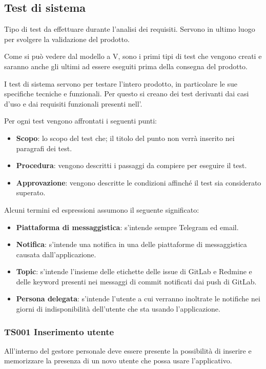 \subsection{Test di sistema}
Tipo di test da effettuare durante l'analisi dei requisiti. Servono in ultimo luogo per svolgere la validazione del prodotto.

Come si può vedere dal modello a V, sono i primi tipi di test che vengono creati e saranno anche gli ultimi ad essere eseguiti prima della consegna del prodotto.

I test di sistema servono per testare l'intero prodotto, in particolare le sue specifiche tecniche e funzionali. Per questo si creano dei test derivanti dai casi d'uso e dai requisiti funzionali presenti nell'\AdRd.

Per ogni test vengono affrontati i seguenti punti:

\begin{itemize}
	\item \textbf{Scopo}: lo scopo del test che; il titolo del punto non verrà inserito nei paragrafi dei test.
	\item \textbf{Procedura}: vengono descritti i passaggi da compiere per eseguire il test.
	\item \textbf{Approvazione}: vengono descritte le condizioni affinché il test sia considerato superato.
\end{itemize}

Alcuni termini ed espressioni assumono il seguente significato:

\begin{itemize}
	\item \textbf{Piattaforma di messaggistica}: s'intende sempre Telegram ed email.
	\item \textbf{Notifica}: s'intende una notifica in una delle piattaforme di messaggistica causata dall'applicazione.
	\item \textbf{Topic}: s'intende l'insieme delle etichette delle issue di GitLab e Redmine e delle keyword presenti nei messaggi di commit notificati dai push di GitLab.
	\item \textbf{Persona delegata}: s'intende l'utente a cui verranno inoltrate le notifiche nei giorni di indisponibilità dell'utente che sta usando l'applicazione. 
\end{itemize}

	\subsubsection{TS001 Inserimento utente}
		All'interno del gestore personale deve essere presente la possibilità di inserire e memorizzare la presenza di un novo utente che possa usare l'applicativo.
		
